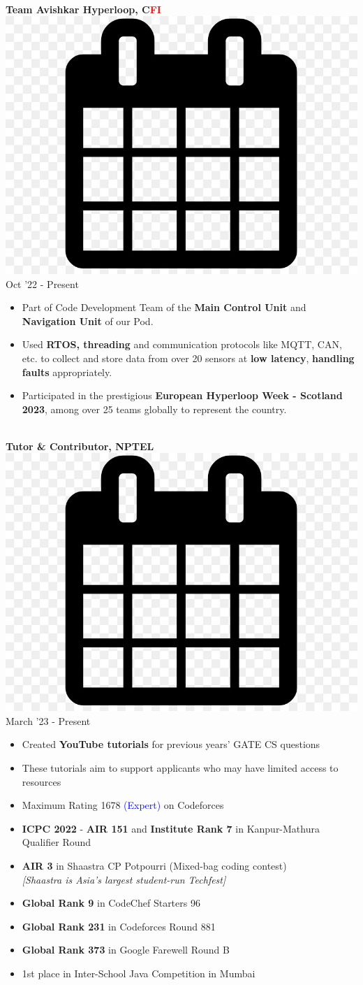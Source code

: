 \documentclass[10pt,article]{article}
\newcommand{\myMargin}{0.2in}
\newcommand{\resheading}[1]{{\small \colorbox{myblue} { \begin{minipage}{\dimexpr\linewidth-2\fboxsep}\centering{\textbf{#1 \vphantom{p\^{E}}}}\end{minipage}}}}
\newcommand{\myfont}[2]{\fontsize{#1}{#1}\selectfont #2}
\newcommand{\subheadingfont}[1]{\myfont{9pt}{#1}}
\newcommand{\projecttopic}[1]{\myfont{9pt}{\textbf{#1}}}
\newcommand{\mycal}[1]{\includegraphics[scale=0.018]{calendar.png} \myfont{10}{#1}}
\begin{document}
\begin{multicols*}{2}
\noindent
\hrulefill \\ [-0.5cm]
\projecttopic{Team Avishkar Hyperloop, C\textcolor{red}{FI}} \hfill \mycal{Oct '22 - Present} 
\begin{itemize}[leftmargin=\myMargin]
    \item Part of Code Development Team of the \textbf{Main Control Unit} and \textbf{Navigation Unit} of our Pod. 
    \item Used \textbf{RTOS, threading} and communication protocols like MQTT, CAN, etc. to collect and store data from over 20 sensors at \textbf{low latency}, \textbf{handling faults} appropriately.
    \item Participated in the prestigious \textbf{European Hyperloop Week - Scotland 2023}, 
    among over 25 teams globally to represent the country.
\end{itemize}
\vspace{3pt}
\noindent
\hrulefill \\ [-0.5cm]
\projecttopic{Tutor \& Contributor, \textcolor{nptel}{NPTEL}} \hfill \mycal{March '23 - Present}
\begin{itemize}[leftmargin=\myMargin]
    \item Created \textbf{YouTube tutorials} for previous years' GATE CS questions
    \item These tutorials aim to support applicants who may have limited access to resources
\end{itemize}


\noindent
\resheading{\subheadingfont{CODING ACHIEVEMENTS}}
 \begin{itemize}[ leftmargin=\myMargin]
    \setlength \itemsep{-0.1em}
  \item Maximum Rating 1678 \textcolor{blue}{(Expert)} on Codeforces
  \item \textbf{ICPC 2022} - \textbf{AIR 151} and \textbf{Institute Rank 7} in Kanpur-Mathura Qualifier Round
\item \textbf{AIR 3} in Shaastra CP Potpourri (Mixed-bag coding contest) \\ \small {\textit{[Shaastra is Asia's largest student-run Techfest]}} 
    \item \normalsize{ \textbf{Global Rank 9} in CodeChef Starters 96} 
    \item \normalsize{ \textbf{Global Rank 231} in Codeforces Round 881} 
    \item \normalsize{ \textbf{Global Rank 373} in Google Farewell Round B} 
    \item  \normalsize {1st place in Inter-School Java Competition in Mumbai}
  \end{itemize}


\end{multicols*}
\end{document}
